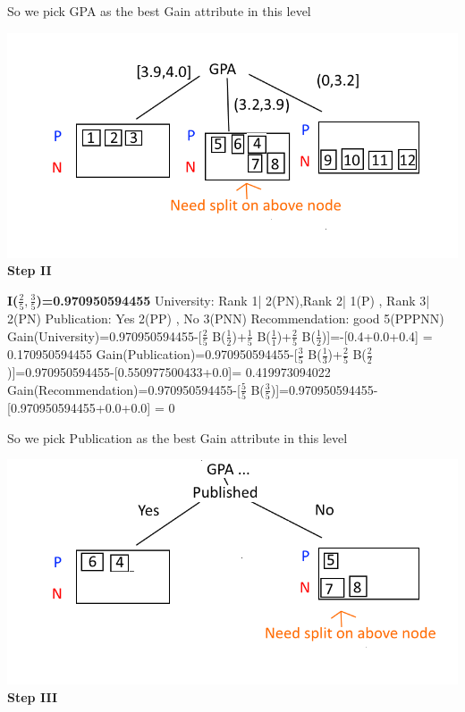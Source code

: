 \documentclass[12pt, letterpaper]{article}
\begin{document}
	So we pick GPA as the best Gain attribute in this level
	
	\includegraphics[scale=0.8]{"problem-2-step1"}
	\textbf{Step II}
	
	\textbf{I($\frac{2}{5},\frac{3}{5}$)=0.970950594455}\newline
	University: Rank 1| 2(PN),Rank 2| 1(P) , Rank 3| 2(PN)\newline
	Publication: Yes 2(PP) , No 3(PNN)\newline
	Recommendation: good 5(PPPNN)\newline\newline
	Gain(University)=0.970950594455-[$\frac{2}{5}$ B($\frac{1}{2}$)+$\frac{1}{5}$ B($\frac{1}{1}$)+$\frac{2}{5}$ B($\frac{1}{2}$)]=-[0.4+0.0+0.4]
	= 0.170950594455\newline\newline
	Gain(Publication)=0.970950594455-[$\frac{3}{5}$ B($\frac{1}{3}$)+$\frac{2}{5}$ B($\frac{2}{2}$)]=0.970950594455-[0.550977500433+0.0]=
	0.419973094022\newline\newline
	Gain(Recommendation)=0.970950594455-[$\frac{5}{5}$ B($\frac{3}{5}$)]=0.970950594455-[0.970950594455+0.0+0.0]
	= 0\newline
	
	So we pick Publication as the best Gain attribute in this level
	
	\includegraphics[scale=0.8]{"problem-2-step2"}
	\textbf{Step III}
	
\end{document}
